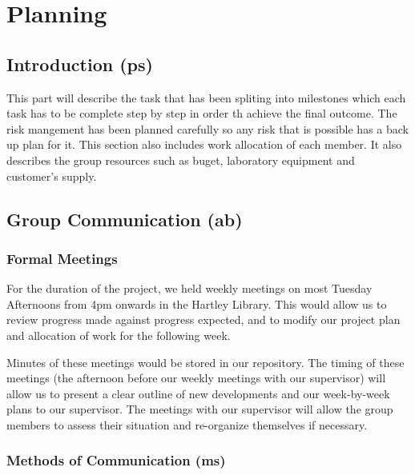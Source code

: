 \chapter{Planning}

\section{Introduction (ps)}
This part will describe the task that has been spliting into milestones which each task has to be complete step by step in order th achieve the final outcome.
The risk mangement has been planned carefully so any risk that is possible has a back up plan for it.
This section also includes work allocation of each member.
It also describes the group resources such as buget, laboratory equipment and customer's supply. 








\section{Group Communication (ab)}
\label{group_comms}

\subsection{Formal Meetings}
\label{formal meetings}
For the duration of the project, we held weekly meetings on most Tuesday 
Afternoons from 4pm onwards in the Hartley Library. This would allow us to 
review progress made against progress expected, and to modify our project 
plan and allocation of work for the following week.

Minutes of these meetings would be stored in our repository.
The timing of these meetings (the afternoon before our weekly meetings with our 
supervisor) will allow us to present a clear outline 
of new developments and our week-by-week plans to our supervisor.
The meetings with our supervisor will allow the group members to assess their situation
and re-organize themselves if necessary.

\subsection{Methods of Communication (ms)}

